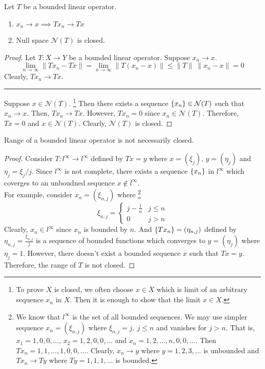 \begin{corollary}
	Let $T$ be a bounded linear operator.
	\begin{enumerate}
		\item $x_n \to x \implies Tx_n \to Tx$
		\item Null space $\mathcal{N}(T)$ is closed.
	\end{enumerate}
\end{corollary}
\begin{proof}
	Let $T : X \to Y$ be a bounded linear operator.
	Suppose $x_n \to x$.
	\[ \lim_{n \to \infty} \|Tx_n - Tx\| = \lim_{n \to \infty} \|T(x_n-x)\| \le \|T\| \ \|x_n-x\| = 0 \]
	Clearly, $Tx_n \to Tx$.\\

	\hrule \vspace{1em}

	Suppose $x \in \overline{\mathcal{N}(T)}$.
	\dag\footnote{
		To prove $X$ is closed, we often choose $x \in \overline{X}$ which is limit of an arbitrary sequence $x_n$ in $X$.
		Then it is enough to show that the limit $x \in X$.}
	Then there exists a sequence $\left\{x_n\right\} \in \mathcal{N}(T)$ such that $x_n \to x$.
	Then, $Tx_n \to Tx$.
	However, $Tx_n = 0$ since $x_n \in \mathcal{N}(T)$.
	Therefore, $Tx = 0$ and $x \in \mathcal{N}(T)$.
	Clearly, $\mathcal{N}(T)$ is closed.
\end{proof}

\begin{remark}
	Range of a bounded linear operator is not necessarily closed.
\end{remark}
\begin{proof}
	Consider $T : l^\infty \to l^\infty$ defined by $Tx = y$ where $x = (\xi_j)$, $y = (\eta_j)$ and $\eta_j = \xi_j/j$.
	Since $l^\infty$ is not complete, there exists a sequence $\left\{x_n\right\}$ in $l^\infty$ which coverges to an unboudned sequence $x \notin l^\infty$.\\

	For example, consider $x_n = (\xi_{n,j})$ where\dag
	\footnote{
		We know that $l^\infty$ is the set of all bounded sequences.
		We may use simpler sequence $x_n = (\xi_{n,j})$ where $\xi_{n,j} = j,\ j \le n$ and vanishes for $j >n$.
		That is, $x_1 = 1,0,0,\dots$, $x_2 = 1,2,0,0,\dots$ and $x_n = 1,2,\dots,n,0,0,\dots$.
		Then $Tx_n = 1,1,\dots,1,0,0,\dots$.
		Clearly, $x_n \to y$ where $y = 1,2,3,\dots$ is unbounded and $Tx_n \to Ty$ where $Ty = 1,1,1,\dots$ is bounded.}
	\[\xi_{n,j} = \begin{cases} j-\frac{1}{n} & j \le n \\ 0 & j > n \end{cases} \]
	Clearly, $x_n \in l^\infty$ since $x_n$ is bounded by $n$.
	And $\left\{Tx_n\right\} = (\eta_{n,j})$ defined by $\eta_{n,j} =\frac{\xi_{n,j}}{j}$ is a sequence of bounded functions which converges to $y= (\eta_j)$ where $\eta_j = 1$.
	However, there doesn't exist a bounded sequence $x$ such that $Tx = y$.
	Therefore, the range of $T$ is not closed.
\end{proof}

